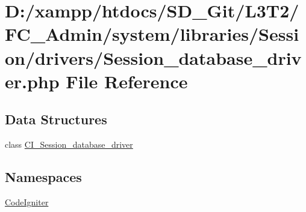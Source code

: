\hypertarget{_session__database__driver_8php}{}\section{D\+:/xampp/htdocs/\+S\+D\+\_\+\+Git/\+L3\+T2/\+F\+C\+\_\+\+Admin/system/libraries/\+Session/drivers/\+Session\+\_\+database\+\_\+driver.php File Reference}
\label{_session__database__driver_8php}
\subsection*{Data Structures}
\begin{DoxyCompactItemize}
\item 
class \hyperlink{class_c_i___session__database__driver}{C\+I\+\_\+\+Session\+\_\+database\+\_\+driver}
\end{DoxyCompactItemize}
\subsection*{Namespaces}
\begin{DoxyCompactItemize}
\item 
 \hyperlink{namespace_code_igniter}{Code\+Igniter}
\end{DoxyCompactItemize}
